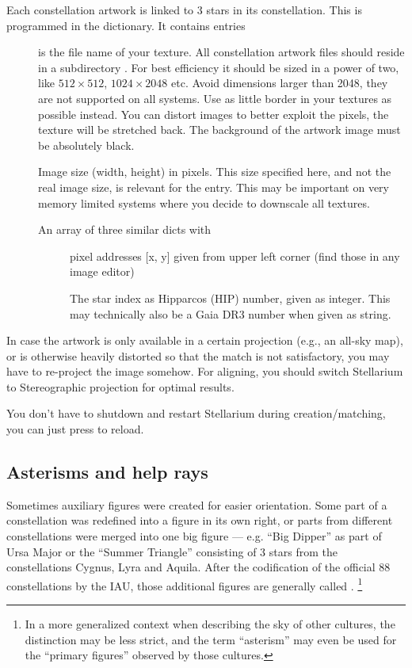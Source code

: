 Each constellation artwork is linked to 3 stars in its constellation. This
is programmed in the  dictionary. It contains entries
\begin{description}
\item[] is the file name of your texture. All constellation artwork files should reside in a subdirectory . 
  For best efficiency it should be
  sized in a power of two, like $512\times512$, $1024\times2048$
  etc. Avoid dimensions larger than 2048, they are not supported on
  all systems. Use as little border in your textures as possible instead.
  You can distort images to better exploit the pixels,
  the texture will be stretched back. The background of the artwork
  image must be absolutely black.
  \item[] Image size (width, height) in pixels. This size specified here, and not the real image size, is relevant for the  entry. 
  This may be important on very memory limited systems where you decide to downscale all textures.
  \item[] An array of three similar dicts with
  \begin{description}
  \item[] pixel addresses [x, y] given from upper left corner (find those in any image editor)
  \item[] The star index as Hipparcos (HIP) number, given as integer. This may technically also be a Gaia DR3 number when given as string.
  \end{description}
\end{description}
%
In case the artwork is only available in a certain projection (e.g.,
an all-sky map), or is otherwise heavily distorted so that the match
is not satisfactory, you may have to re-project the image somehow. For
aligning, you should switch Stellarium to Stereographic projection for
optimal results.

You don't have to shutdown and restart Stellarium during
creation/matching, you can just press  to reload.


\subsection{Asterisms and help rays}
\label{sec:skycultures:asterisms}
\label{SC:asterisms}

Sometimes auxiliary figures were created for easier orientation. Some part of a 
constellation was redefined into a figure in its own right, or  parts from different 
constellations were merged into one big figure --- e.g. ``Big Dipper'' as part of Ursa Major or the 
``Summer Triangle'' consisting of 3 stars from the constellations Cygnus, Lyra and Aquila. 
After the codification of the official 88 constellations by the IAU, those additional figures
are generally called . \footnote{In a more generalized context when describing the sky of
  other cultures, the distinction may be less strict, and the term ``asterism'' may even be used 
  for the ``primary figures'' observed by those cultures.}

